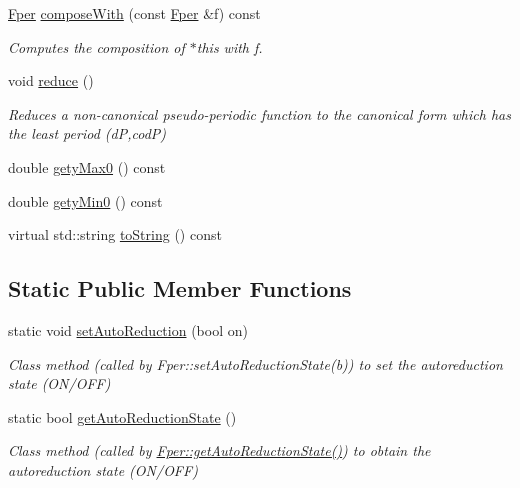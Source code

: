 \begin{DoxyCompactItemize}
\mbox{\hyperlink{classetvo_i_i_1_1_fper}{Fper}} \mbox{\hyperlink{classetvo_i_i_1_1_fper_a1b0d0e74f06c5bc668f38b3028db701e}{compose\+With}} (const \mbox{\hyperlink{classetvo_i_i_1_1_fper}{Fper}} \&f) const
\begin{DoxyCompactList}\small\item\em Computes the composition of $\ast$this with f. \end{DoxyCompactList}\item 
\mbox{\label{classetvo_i_i_1_1_fper_a9e5ae73894496db518fa696dafd6b09b}} 
void \mbox{\hyperlink{classetvo_i_i_1_1_fper_a9e5ae73894496db518fa696dafd6b09b}{reduce}} ()
\begin{DoxyCompactList}\small\item\em Reduces a non-\/canonical pseudo-\/periodic function to the canonical form which has the least period (dP,codP) \end{DoxyCompactList}\item 
double \mbox{\hyperlink{classetvo_i_i_1_1_fper_a02538c38c894b6af355209a45749e775}{gety\+Max0}} () const
\item 
double \mbox{\hyperlink{classetvo_i_i_1_1_fper_ad2a56b9c2325157a6f45ea9ceefe6256}{gety\+Min0}} () const
\item 
virtual std\+::string \mbox{\hyperlink{classetvo_i_i_1_1_fper_a53276a36ff7ada879be26655ccff7ed6}{to\+String}} () const
\end{DoxyCompactItemize}
\subsection*{Static Public Member Functions}
\begin{DoxyCompactItemize}
\item 
\mbox{\label{classetvo_i_i_1_1_fper_a47118d5b3462fce0165863dffef63d5b}} 
static void \mbox{\hyperlink{classetvo_i_i_1_1_fper_a47118d5b3462fce0165863dffef63d5b}{set\+Auto\+Reduction}} (bool on)
\begin{DoxyCompactList}\small\item\em Class method (called by Fper\+::set\+Auto\+Reduction\+State(b)) to set the autoreduction state (O\+N/\+O\+FF) \end{DoxyCompactList}\item 
\mbox{\label{classetvo_i_i_1_1_fper_a8f61cf7b70759ade78c51ffaf309cf7b}} 
static bool \mbox{\hyperlink{classetvo_i_i_1_1_fper_a8f61cf7b70759ade78c51ffaf309cf7b}{get\+Auto\+Reduction\+State}} ()
\begin{DoxyCompactList}\small\item\em Class method (called by \mbox{\hyperlink{classetvo_i_i_1_1_fper_a8f61cf7b70759ade78c51ffaf309cf7b}{Fper\+::get\+Auto\+Reduction\+State()}}) to obtain the autoreduction state (O\+N/\+O\+FF) \end{DoxyCompactList}\end{DoxyCompactItemize}
